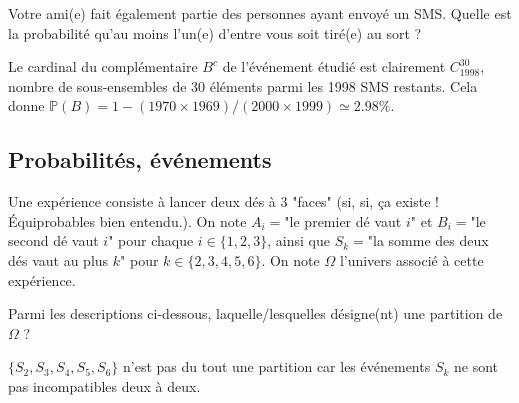 \begin{question}
Votre ami(e) fait également partie des personnes ayant envoyé un SMS. Quelle est la probabilité qu'au moins l'un(e) d'entre vous soit tiré(e) au sort ?
\begin{answers}
\end{answers}
\begin{explanations}
Le cardinal du complémentaire $B^c$ de l'événement étudié est clairement $C_{1998}^{30}$,  nombre de sous-ensembles de 30 éléments parmi les 1998 SMS restants. Cela donne $\mathbb{P}(B)=1- (1970\times 1969)/(2000\times 1999) \simeq  2.98\%$.
\end{explanations}
\end{question}



\subsection{Probabilités, événements}


Une expérience consiste à lancer deux dés à 3 "faces" (si, si, ça existe ! \'Equiprobables bien entendu.). On note $A_i=$"le premier dé vaut $i$" et $B_i=$"le second dé vaut $i$" pour chaque $i\in\{1,2,3\}$, ainsi que $S_k=$"la somme des deux dés vaut au plus $k$" pour $k\in \{2,3,4,5,6\}$. On note $\Omega$ l'univers associé à cette expérience.

\begin{question}
Parmi les descriptions ci-dessous, laquelle/lesquelles désigne(nt) une partition de $\Omega$ ?
\begin{answers}
\end{answers}
\begin{explanations}
$\{S_2,S_3,S_4,S_5,S_6\}$ n'est pas du tout une partition car les événements $S_k$ ne sont pas incompatibles deux à deux.
\end{explanations}
\end{question}


